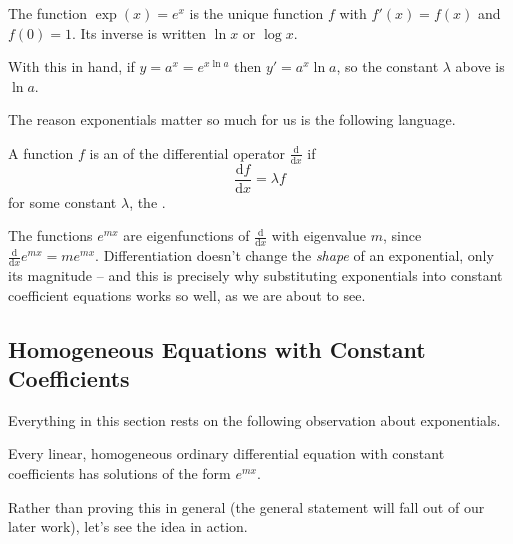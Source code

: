 \documentclass[a4paper]{scrartcl}
\begin{document}
\begin{definition}
	The function $\exp(x) = e^x$ is the unique function $f$ with $f'(x) = f(x)$ and $f(0) = 1$. Its inverse is written $\ln x$ or $\log x$.
\end{definition}

With this in hand, if $y = a^x = e^{x \ln a}$ then $y' = a^x \ln a$, so the constant $\lambda$ above is $\ln a$.

The reason exponentials matter so much for us is the following language.

\begin{definition}[Eigenfunction]
	A function $f$ is an  of the differential operator $\frac{\mathrm{d}}{\mathrm{d}x}$ if
	$$
	\frac{\mathrm{d}f}{\mathrm{d}x} = \lambda f
	$$
	for some constant $\lambda$, the .
\end{definition}

The functions $e^{mx}$ are eigenfunctions of $\frac{\mathrm{d}}{\mathrm{d}x}$ with eigenvalue $m$, since $\frac{\mathrm{d}}{\mathrm{d}x} e^{mx} = m e^{mx}$. Differentiation doesn't change the \emph{shape} of an exponential, only its magnitude -- and this is precisely why substituting exponentials into constant coefficient equations works so well, as we are about to see.

\subsection{Homogeneous Equations with Constant Coefficients}

Everything in this section rests on the following observation about exponentials.

\begin{proposition}
	Every linear, homogeneous ordinary differential equation with constant coefficients has solutions of the form $e^{mx}$.
\end{proposition}

Rather than proving this in general (the general statement will fall out of our later work), let's see the idea in action.
\end{document}
